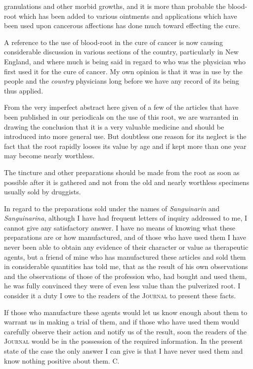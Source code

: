 granulations and other morbid growths, and it is more than probable
the blood-root which has been added to various ointments and
applications which have been used upon cancerous affections has done
much toward effecting the cure.

A reference to the use of blood-root in the cure of cancer is now
causing considerable discussion in various sections of the country, particularly
in New England, and where much is being said in regard to
who was the physician who first used it for the cure of cancer. My
own opinion is that it was in use by the people and the \emph{country} physicians
long before we have any record of its being thus applied.

From the very imperfect abstract here given of a few of the articles
that have been published in our periodicals on the use of this root, we are
warranted in drawing the conclusion that it is a very valuable medicine
and should be introduced into more general use. But doubtless one
reason for its neglect is the fact that the root rapidly looses its value by
age and if kept more than one year may become nearly worthless.

The tincture and other preparations should be made from the root as
soon as possible after it is gathered and not from the old and nearly
worthless specimens usually sold by druggists.

In regard to the preparations sold under the names of \emph{Sanguinarin}
and \emph{Sanguinarina}, although I have had frequent letters of inquiry
addressed to me, I cannot give any satisfactory answer. I have no
means of knowing what these preparations are or how manufactured,
and of those who have used them I have never been able to obtain any
evidence of their character or value as therapeutic agents, but a friend
of mine who has manufactured these articles and sold them in considerable
quantities has told me, that as the result of his own observations
and the observations of those of the profession who, had bought and
used them, he was fully convinced they were of even less value than
the pulverized root. I consider it a duty I owe to the readers of the
\textsc{Journal} to present these facts.

If those who manufacture these agents would let us know enough
about them to warrant us in making a trial of them, and if those who
have used them would carefully observe their action and notify us of
the result, soon the readers of the \textsc{Journal} would be in the possession
of the required information. In the present state of the case the only
answer I can give is that I have never used them and know nothing
positive about them. \hfill{}C.\endinput

